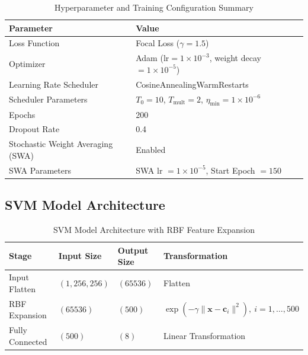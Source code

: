 \documentclass[conference]{IEEEtran}
\begin{document}
\begin{table}[htbp]
    \centering
    \caption{Hyperparameter and Training Configuration Summary}
    \begin{tabular}{@{}ll@{}}
    \toprule
    \textbf{Parameter} & \textbf{Value} \\
    \midrule
    Loss Function & Focal Loss ($\gamma = 1.5$) \\
    Optimizer & Adam ($\text{lr} = 1 \times 10^{-3}$, weight decay $= 1 \times 10^{-5}$) \\
    Learning Rate Scheduler & CosineAnnealingWarmRestarts \\
    Scheduler Parameters & $T_0 = 10$, $T_{\text{mult}} = 2$, $\eta_{\text{min}} = 1 \times 10^{-6}$ \\
    Epochs & 200 \\
    Dropout Rate & 0.4 \\
    Stochastic Weight Averaging (SWA) & Enabled \\
    SWA Parameters & SWA lr $= 1 \times 10^{-5}$, Start Epoch $= 150$ \\
    \bottomrule
    \end{tabular}
    \label{tab:cnn_training_config}
\end{table}

\subsection{SVM Model Architecture} \label{app:svm-architecture}
\begin{table}[htbp]
    \centering
    \caption{SVM Model Architecture with RBF Feature Expansion}
    \begin{tabular}{llll}
    \toprule
    \textbf{Stage} & \textbf{Input Size} & \textbf{Output Size} & \textbf{Transformation} \\
    \midrule
    Input Flatten & $(1, 256, 256)$ & $(65536)$ & Flatten \\
    RBF Expansion & $(65536)$ & $(500)$ & $\exp\left(-\gamma \| \mathbf{x} - \mathbf{c}_i \|^2\right),\ i=1,\dots,500$ \\
    Fully Connected & $(500)$ & $(8)$ & Linear Transformation \\
    \bottomrule
    \end{tabular}
    \label{tab:svm_architecture}
\end{table}
\end{document}
